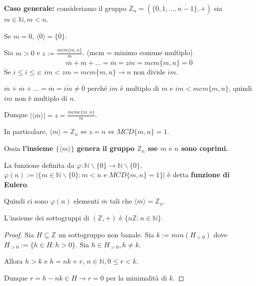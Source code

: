 \documentclass[../main.tex]{subfiles}
\begin{document}
\textbf{Caso generale:} consideriamo il gruppo $\mathbb{Z}_n = (\{\overline{0},\overline{1},\ldots,\overline{n-1}\},+) $ sia $m \in \mathbb{N}, m < n$.

Se $m=0$, $\langle \overline{0} \rangle = \{\overline{0}\}$.

Sia $m > 0 $ e $z := \frac{mcm \{m,n\}}{m}$. (mcm = minimo comune multiplo)
\begin{equation*}
    \overline{m}+\overline{m}+\ldots=\overline{m} = \overline{zm} = \overline{mcm \{m,n\}} = \overline{0}
\end{equation*}
Se $i \leq i \leq z$: $im < zm = mcm \{m,n\} \rightarrow n \text{ non divide } im$.

$\overline{m}+\overline{m}+\ldots=\overline{m} = \overline{im} \neq \overline{0}$ perché $im$ è multiplo di $m$ e $im < mcm \{m,n\}$, quindi $im$ non è multiplo di $n$.

Dunque $|\langle \overline{m} \rangle| = z= \frac{mcmc \{m,n\}}{m}$.

In particolare, $\langle \overline{m} \rangle = \mathbb{Z}_n \iff z=n \iff MCD \{m,n\}=1$.

Ossia \textbf{l'insieme $\{\overline \langle m \rangle \}$ genera il gruppo $\mathbb{Z}_n$ sse $m \text{ e } n$ sono coprimi.}

\begin{definition}
    La funzione definita da $\varphi : \mathbb{N} \backslash \{0\} \rightarrow \mathbb{N} \backslash \{0\}$, $\varphi(n) := |\{m \in \mathbb{N} \backslash \{0\} : m < n \text{ e } MCD \{m,n\} = 1\}|$ è detta \textbf{funzione di Eulero}.

    Quindi ci sono $\varphi(n)$ elementi $\overline{m}$ tali che $\langle \overline{m} \rangle = \mathbb{Z}_n$.
\end{definition}

\begin{proposition}
    L'insieme dei sottogruppi di $(\mathbb{Z} ,+)$ è $\{n \mathbb{Z} : n \in \mathbb{N} \} $.
\end{proposition}

\begin{proof}
    Sia $H \subseteq \mathbb{Z} $ un sottogruppo non banale. Sia $k := min (H_{>0})$ dove $H_{>0} := \{h \in H : h > 0\}$. Sia $h \in H_{>0}, h \neq k$.

    Allora $h > k$ e $h = nk + r$, $n \in \mathbb{N} , 0 \leq r <k$.

    Dunque $r = h - nk \in H \rightarrow r =0$ per la minimalità di $k$.
\end{proof}
\end{document}
